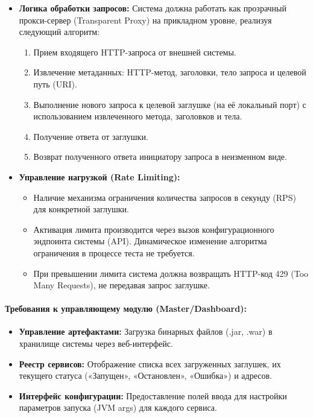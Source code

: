 \documentclass[
]{article}
\begin{document}
\begin{itemize}
\item
  \textbf{Логика обработки запросов:} Система должна работать как
  прозрачный прокси-сервер (Transparent Proxy) на прикладном уровне,
  реализуя следующий алгоритм:

  \begin{enumerate}
  \def\labelenumi{\arabic{enumi}.}
  \item
    Прием входящего HTTP-запроса от внешней системы.
  \item
    Извлечение метаданных: HTTP-метод, заголовки, тело запроса и целевой
    путь (URI).
  \item
    Выполнение нового запроса к целевой заглушке (на её локальный порт)
    с использованием извлеченного метода, заголовков и тела.
  \item
    Получение ответа от заглушки.
  \item
    Возврат полученного ответа инициатору запроса в неизменном виде.
  \end{enumerate}
\item
  \textbf{Управление нагрузкой (Rate Limiting):}

  \begin{itemize}
  \item
    Наличие механизма ограничения количества запросов в секунду (RPS)
    для конкретной заглушки.
  \item
    Активация лимита производится через вызов конфигурационного
    эндпоинта системы (API). Динамическое изменение алгоритма
    ограничения в процессе теста не требуется.
  \item
    При превышении лимита система должна возвращать HTTP-код 429 (Too
    Many Requests), не передавая запрос заглушке.
  \end{itemize}
\end{itemize}

\paragraph{Требования к управляющему модулю
(Master/Dashboard):}\label{ux442ux440ux435ux431ux43eux432ux430ux43dux438ux44f-ux43a-ux443ux43fux440ux430ux432ux43bux44fux44eux449ux435ux43cux443-ux43cux43eux434ux443ux43bux44e-masterdashboard}

\begin{itemize}
\item
  \textbf{Управление артефактами:} Загрузка бинарных файлов (.jar, .war)
  в хранилище системы через веб-интерфейс.
\item
  \textbf{Реестр сервисов:} Отображение списка всех загруженных
  заглушек, их текущего статуса («Запущен», «Остановлен», «Ошибка») и
  адресов.
\item
  \textbf{Интерфейс конфигурации:} Предоставление полей ввода для
  настройки параметров запуска (JVM args) для каждого сервиса.
\end{itemize}
\end{document}

